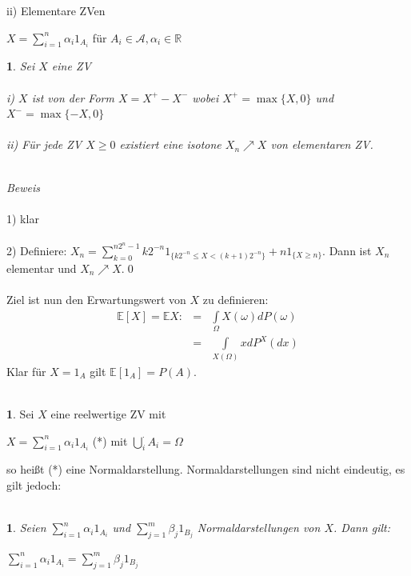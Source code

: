 \documentclass[10pt,a4paper]{report}
\numberwithin{equation}{section}
\numberwithin{figure}{section}
\theoremstyle{plain}
\theoremstyle{definition}
\newtheorem{defn}{\protect\definitionname}[section]
\theoremstyle{plain}
\newtheorem{prop}{\protect\propositionname}[section]
\theoremstyle{definition}
\theoremstyle{remark}
\theoremstyle{plain}
\newtheorem{lem}{\protect\lemmaname}[section]
\theoremstyle{plain}
\theoremstyle{plain}
\theoremstyle{plain}
\theoremstyle{plain}
\providecommand{\definitionname}{Definition}
\providecommand{\lemmaname}{Lemma}
\providecommand{\propositionname}{Satz}
\newcommand{\1}{ \mathbb{1} } %
\begin{document}
ii) Elementare ZVen
\begin{center}
$X=\sum\limits_{i=1}^n \alpha_i 1_{A_i}$ für $A_i \in \mathcal{A}, \alpha_i \in \mathbb{R}$
\end{center}
\begin{prop}
  Sei $X$ eine ZV\\\\
  i) $X$ ist von der Form $X=X^+-X^-$ wobei $X^+=\max\{X,0\}$ und $X^-=\max\{-X,0\}$\\\\
  ii) Für jede ZV $X\geq0$ existiert eine isotone $X_n \nearrow X$ von elementaren ZV.\\\\
\end{prop}
\textit{Beweis}\\\\
1) klar\\\\
2) Definiere: $X_n=\sum\limits_{k=0}^{n2^n-1}k2^{-n}1_{\{k2^{-n}\leq X < (k+1)2^{-n}\}}+n1_{\{X\geq n\}}$. Dann ist $X_n$ elementar und $X_n \nearrow X$.\qed\\\\
Ziel ist nun den Erwartungswert von $X$ zu definieren:
\begin{eqnarray*}
\mathbb{E}[X]=\mathbb{E}X:&=&\int\limits_\Omega X(\omega)dP(\omega)\\
&=&\int\limits_{X(\Omega)}x dP^X(dx)
\end{eqnarray*} 
Klar für $X=1_A$ gilt $\mathbb{E}[1_A]=P(A)$.\\\\
\begin{defn}
  Sei $X$ eine reelwertige ZV mit
  \begin{center}
    $X=\sum\limits_{i=1}^n\alpha_i1_{A_i}$ (*) mit $\bigcup_i^\cdot
    A_i=\Omega$
  \end{center}
  so heißt (*) eine Normaldarstellung. Normaldarstellungen sind nicht eindeutig, es gilt jedoch:\\\\
\end{defn}
\begin{lem}
  Seien $\sum\limits_{i=1}^n \alpha_i 1_{A_i}$ und
  $\sum\limits_{j=1}^m\beta_j1_{B_j}$ Normaldarstellungen von
  $X$. Dann gilt:
  \begin{center}
    $\sum\limits_{i=1}^n \alpha_i
    1_{A_i}=\sum\limits_{j=1}^m\beta_j1_{B_j}$
  \end{center}
\end{lem}
\end{document}
